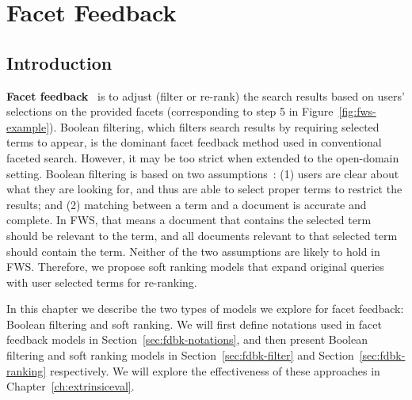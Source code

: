 \chapter{Facet Feedback}
\label{ch:feedback}
\section{Introduction}
\label{sec:fdbk-intro}
\textbf{Facet feedback}~\cite{kong2014extending} is to adjust (filter or re-rank) the search results based on users' selections on the provided facets (corresponding to step 5 in Figure~\ref{fig:fws-example}). Boolean filtering, which filters search results by requiring selected terms to appear, is the dominant facet feedback method used in conventional faceted search. However, it may be too strict when extended to the open-domain setting. Boolean filtering is based on two assumptions~\cite{zhang2010interactive}: (1) users are clear about what they are looking for, and thus are able to select proper terms to restrict the results; and (2) matching between a term and a document is accurate and complete. In FWS, that means a document that contains the selected term should be relevant to the term, and all documents relevant to that selected term should contain the term. Neither of the two assumptions are likely to hold in FWS.
Therefore, we propose soft ranking models that expand original queries with user selected terms for re-ranking.

In this chapter we describe the two types of models we explore for facet feedback: Boolean filtering and soft ranking. We will first define notations used in facet feedback models in Section~\ref{sec:fdbk-notations}, and then present Boolean filtering and soft ranking models in Section~\ref{sec:fdbk-filter} and Section~\ref{sec:fdbk-ranking} respectively.  We will explore the effectiveness of these approaches in Chapter~\ref{ch:extrinsiceval}. 

